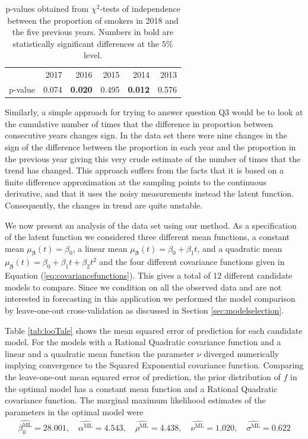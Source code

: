 \documentclass[
  11pt,
]{article}
\theoremstyle{nonumberplain}
\begin{document}
\begin{table}[htbp]
\center
\begin{tabular}{c|rrrrr} \hline
 & 2017 & 2016 & 2015 & 2014 & 2013\\ 
p-value & 0.074 & \textbf{0.020} & 0.495 & \textbf{0.012} & 0.576\\ \hline
\end{tabular}
\caption{p-values obtained from $\chi^2$-tests of independence between the proportion of smokers in 2018 and the five previous years. Numbers in bold are statistically significant differences at the $5\%$ level.}
\label{tab:chisqtests}
\end{table}

Similarly, a simple approach for trying to answer question Q3 would be
to look at the cumulative number of times that the difference in
proportion between consecutive years changes sign. In the data set there
were nine changes in the sign of the difference between the proportion
in each year and the proportion in the previous year giving this very
crude estimate of the number of times that the trend has changed. This
approach suffers from the facts that it is based on a finite difference
approximation at the sampling points to the continuous derivative, and
that it uses the noisy measurements instead the latent function.
Consequently, the changes in trend are quite unstable.

We now present an analysis of the data set using our method. As a
specification of the latent function we considered three different mean
functions, a constant mean \(\mu_{\bm{\beta}}(t) = \beta_0\), a linear
mean \(\mu_{\bm{\beta}}(t) = \beta_0 + \beta_1 t\), and a quadratic mean
\(\mu_{\bm{\beta}}(t) = \beta_0 + \beta_1 t + \beta_2 t^2\) and the four
different covariance functions given in Equation
(\ref{eq:covariancefunctions}). This gives a total of 12 different
candidate models to compare. Since we condition on all the observed data
and are not interested in forecasting in this application we performed
the model comparison by leave-one-out cross-validation as discussed in
Section \ref{sec:modelselection}.

Table \ref{tab:looTale} shows the mean squared error of prediction for
each candidate model. For the models with a Rational Quadratic
covariance function and a linear and a quadratic mean function the
parameter \(\nu\) diverged numerically implying convergence to the
Squared Exponential covariance function. Comparing the leave-one-out
mean squared error of prediction, the prior distribution of \(f\) in the
optimal model has a constant mean function and a Rational Quadratic
covariance function. The marginal maximum likelihood estimates of the
parameters in the optimal model were \begin{align}
  \widehat{\beta_0^\text{ML}} = 28.001, \quad \widehat{\alpha^\text{ML}} = 4.543, \quad \widehat{\rho^\text{ML}} = 4.438, \quad \widehat{\nu^\text{ML}} = 1.020, \quad \widehat{\sigma^\text{ML}} = 0.622\label{eq:mlEstimates}
\end{align}
\end{document}

